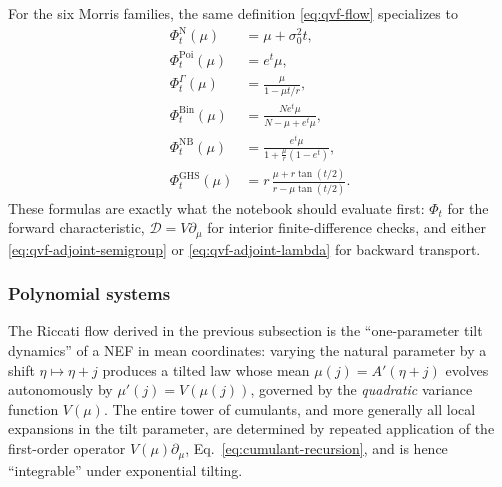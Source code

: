 \documentclass[a4paper,11pt]{article}
\numberwithin{equation}{section}
\theoremstyle{plain}
\theoremstyle{definition}
\theoremstyle{remark}
\newcommand{\1}{\ensuremath{\mathds{1}}\xspace}
\begin{document}
For the six Morris families, the same definition \eqref{eq:qvf-flow} specializes to
\begin{align}
\Phi_t^{\mathrm{N}}(\mu)&=\mu+\sigma_0^2 t,
\nonumber\\
\Phi_t^{\mathrm{Poi}}(\mu)&=e^t\mu,
\nonumber\\
\Phi_t^{\Gamma}(\mu)&=\frac{\mu}{1-\mu t/r},
\nonumber\\
\Phi_t^{\mathrm{Bin}}(\mu)&=\frac{N e^t\mu}{N-\mu+e^t\mu},
\label{eq:qvf-family-flows}\\
\Phi_t^{\mathrm{NB}}(\mu)&=\frac{e^t\mu}{1+\frac{\mu}{r}(1-e^t)},
\nonumber\\
\Phi_t^{\mathrm{GHS}}(\mu)&=
r\,\frac{\mu+r\tan(t/2)}{r-\mu\tan(t/2)}.
\nonumber
\end{align}
These formulas are exactly what the notebook should evaluate first: $\Phi_t$ for the forward characteristic, $\mathcal D=V\partial_\mu$ for interior finite-difference checks, and either \eqref{eq:qvf-adjoint-semigroup} or \eqref{eq:qvf-adjoint-lambda} for backward transport.

\subsubsection{Polynomial systems}

The Riccati flow derived in the previous subsection is the ``one-parameter tilt dynamics'' of a NEF in mean
coordinates: varying the natural parameter by a shift $\eta\mapsto\eta+j$ produces a tilted law whose mean
$\mu(j)=A'(\eta+j)$ evolves autonomously by $\mu'(j)=V(\mu(j))$, governed by the \emph{quadratic} variance function $V(\mu)$.
The entire tower of cumulants, and more generally all local expansions in the
tilt parameter, are determined by repeated application of the first-order operator $V(\mu)\partial_\mu$, Eq.\ \eqref{eq:cumulant-recursion}, and is hence ``integrable'' under exponential tilting.
\end{document}
